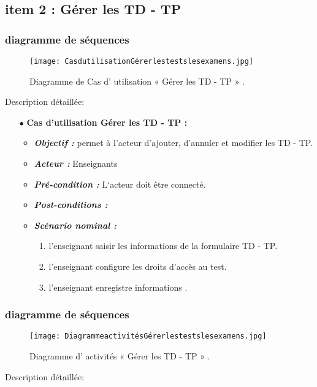 \subsection{item 2 : Gérer les  TD  -  TP}

\subsubsection{diagramme de séquences }
\begin{figure}[ht]
	\centering
	\texttt{[image: CasdutilisationGérerlestestslesexamens.jpg]}
	\caption{Diagramme de Cas d' utilisation « Gérer les  TD  -  TP » .}
	\label{fig:Diagramme de Cas d' utilisation  Gérer les  TD  -  TP }
\end{figure}
\FloatBarrier
{\Large \color{cyan} Description détaillée:}
\begin{itemize}
	\item[$\bullet$] \textbf{Cas d’utilisation  Gérer les  TD  -  TP :} 
	\medskip
	\begin{itemize}
		\item \textit{\textbf{Objectif :}} permet à l’acteur d’ajouter, d’annuler et modifier les  TD  -  TP.
		\item \textit{\textbf{Acteur :}} Enseignants
		
		\item \textit{\textbf{Pré-condition  :}} L‘acteur doit être connecté.
		\item \textit{\textbf{Post-conditions   :}}
		\item \textit{\textbf{Scénario nominal :}}
		\begin{enumerate} 
			\item  l'enseignant saisir les informations de la formulaire TD  -  TP. 
			\item     l'enseignant configure les droits d’accès au test. 
			\item   l'enseignant enregistre informations .


		\end{enumerate}
	\end{itemize}
\end{itemize}	
\bigskip
\subsubsection{diagramme de séquences }
\begin{figure}[ht]
	\centering
	\texttt{[image: DiagrammeactivitésGérerlestestslesexamens.jpg]}
	\caption{Diagramme d' activités « Gérer les  TD  -  TP » .}
	\label{fig:Diagramme d' activités  Gérer les  TD  -  TP }
\end{figure}
\FloatBarrier
{\Large \color{cyan} Description détaillée:}

